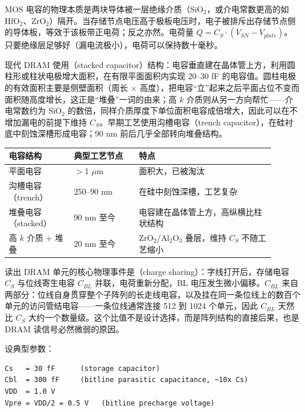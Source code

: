
MOS 电容的物理本质是两块导体被一层绝缘介质（$\text{SiO}_2$，或介电常数更高的如 $\text{HfO}_2$、$\text{ZrO}_2$）隔开。当存储节点电压高于极板电压时，电子被排斥出存储节点侧的导体板，等效于该板带正电荷；反之亦然。电荷量 $Q = C_S \cdot (V_{SN} - V_{plate})$。只要绝缘层足够好（漏电流极小），电荷可以保持数十毫秒。

现代 DRAM 使用（stacked capacitor）结构：电容垂直建在晶体管上方，利用圆柱形或柱状电极增大面积，在有限平面面积内实现 20--30 fF 的电容值。圆柱电极的有效面积主要是侧壁面积（周长 $\times$ 高度），把电容“立”起来之后平面占位不变而面积随高度增长，这正是“堆叠”一词的由来；高 $k$ 介质则从另一方向帮忙——介电常数约为 $\text{SiO}_2$ 的数倍，同样介质厚度下单位面积电容成倍增大，因此可以在不增加漏电的前提下维持 $C_S$。早期工艺使用沟槽电容（trench capacitor），在硅衬底中刻蚀深槽形成电容；90 nm 前后几乎全部转向堆叠结构。

\begin{longtable}{L{0.22\linewidth}L{0.22\linewidth}L{0.46\linewidth}}
\toprule
电容结构 & 典型工艺节点 & 特点 \\
\midrule
平面电容 & $>$1 $\mu$m & 面积大，已被淘汰 \\
沟槽电容（trench） & 250--90 nm & 在硅中刻蚀深槽，工艺复杂 \\
堆叠电容（stacked） & 90 nm 至今 & 电容建在晶体管上方，高纵横比柱状结构 \\
高 $k$ 介质 + 堆叠 & 20 nm 至今 & $\text{ZrO}_2$/$\text{Al}_2\text{O}_3$ 叠层，维持 $C_S$ 不随工艺缩小 \\
\bottomrule
\end{longtable}


读出 DRAM 单元的核心物理事件是（charge sharing）：字线打开后，存储电容 $C_S$ 与位线寄生电容 $C_{BL}$ 并联，电荷重新分配，BL 电压发生微小偏移。$C_{BL}$ 来自两部分：位线自身贯穿整个子阵列的长走线电容，以及挂在同一条位线上的数百个单元的访问管结电容——一条位线通常连接 512 到 1024 个单元，因此 $C_{BL}$ 天然比 $C_S$ 大约一个数量级。这个比值不是设计选择，而是阵列结构的直接后果，也是 DRAM 读信号必然微弱的原因。

设典型参数：
\begin{lstlisting}[numbers=none]
Cs   = 30 fF      (storage capacitor)
Cbl  = 300 fF     (bitline parasitic capacitance, ~10x Cs)
VDD  = 1.0 V
Vpre = VDD/2 = 0.5 V   (bitline precharge voltage)
\end{lstlisting}

